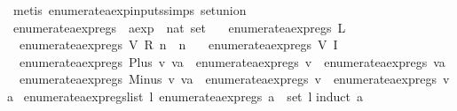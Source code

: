 \begin{isabellebody}
\ {\isacharparenleft}metis\ enumerate{\isacharunderscore}aexp{\isacharunderscore}inputs{\isachardot}simps{\isacharparenleft}{}{\isacharparenright}\ set{\isacharunderscore}union{\isacharparenright}\isanewline
{}\isamarkupfalse%
%
\endisatagproof
{\isafoldproof}%
%
\isadelimproof
\isanewline
%
\endisadelimproof
\isanewline
{}\isamarkupfalse%
\ enumerate{\isacharunderscore}aexp{\isacharunderscore}regs\ {\isacharcolon}{\isacharcolon}\ {\isachardoublequoteopen}aexp\ {\isasymRightarrow}\ nat\ set{\isachardoublequoteclose}\ \isanewline
\ \ {\isachardoublequoteopen}enumerate{\isacharunderscore}aexp{\isacharunderscore}regs\ {\isacharparenleft}L\ {\isacharunderscore}{\isacharparenright}\ {\isacharequal}\ {\isacharbraceleft}{\isacharbraceright}{\isachardoublequoteclose}\ {\isacharbar}\isanewline
\ \ {\isachardoublequoteopen}enumerate{\isacharunderscore}aexp{\isacharunderscore}regs\ {\isacharparenleft}V\ {\isacharparenleft}R\ n{\isacharparenright}{\isacharparenright}\ {\isacharequal}\ {\isacharbraceleft}n{\isacharbraceright}{\isachardoublequoteclose}\ {\isacharbar}\isanewline
\ \ {\isachardoublequoteopen}enumerate{\isacharunderscore}aexp{\isacharunderscore}regs\ {\isacharparenleft}V\ {\isacharparenleft}I\ {\isacharunderscore}{\isacharparenright}{\isacharparenright}\ {\isacharequal}\ {\isacharbraceleft}{\isacharbraceright}{\isachardoublequoteclose}\ {\isacharbar}\isanewline
\ \ {\isachardoublequoteopen}enumerate{\isacharunderscore}aexp{\isacharunderscore}regs\ {\isacharparenleft}Plus\ v\ va{\isacharparenright}\ {\isacharequal}\ enumerate{\isacharunderscore}aexp{\isacharunderscore}regs\ v\ {\isasymunion}\ enumerate{\isacharunderscore}aexp{\isacharunderscore}regs\ va{\isachardoublequoteclose}\ {\isacharbar}\isanewline
\ \ {\isachardoublequoteopen}enumerate{\isacharunderscore}aexp{\isacharunderscore}regs\ {\isacharparenleft}Minus\ v\ va{\isacharparenright}\ {\isacharequal}\ enumerate{\isacharunderscore}aexp{\isacharunderscore}regs\ v\ {\isasymunion}\ enumerate{\isacharunderscore}aexp{\isacharunderscore}regs\ va{\isachardoublequoteclose}\isanewline
\isanewline
{}\isamarkupfalse%
\ enumerate{\isacharunderscore}aexp{\isacharunderscore}regs{\isacharunderscore}list{\isacharcolon}\ {\isachardoublequoteopen}{\isasymexists}l{\isachardot}\ enumerate{\isacharunderscore}aexp{\isacharunderscore}regs\ a\ {\isacharequal}\ set\ l{\isachardoublequoteclose}\isanewline
%
\isadelimproof
%
\endisadelimproof
%
\isatagproof
{}\isamarkupfalse%
{\isacharparenleft}induct\ a{\isacharparenright}\isanewline
{}\isamarkupfalse%

\end{isabellebody}
